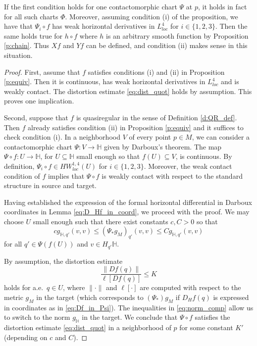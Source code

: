 \documentclass[10pt,letterpaper]{amsart}
\theoremstyle{definition}
\numberwithin{thm}{subsection}
\numberwithin{equation}{section}
\begin{document}
If the first condition holds for one contactomorphic chart $\Psi$
at $p$, it holds in fact for all such charts $\Phi$.
Moreover, assuming condition (i) of the proposition, we have that $\Psi_i \circ f$ has
weak horizontal derivatives in $L_{loc}^4$ for $i\in \{1,2,3\}$.
Then the same holds true for $h \circ f$ where $h$ is an arbitrary
smooth function by Proposition \ref{p:chain}.
Thus $Xf$ and $Yf$ can be defined, and
condition (ii) makes sense in this situation.

\begin{proof}
First, assume that $f$ satisfies conditions (i) and (ii) in Proposition \ref{p:equiv}. Then it is continuous,
has weak horizontal derivatives in $L_{loc}^{4}$ and is weakly contact. The distortion estimate
\eqref{eq:dist_quot} holds by assumption. This proves one implication.

Second, suppose that $f$ is quasiregular in the sense of
Definition \ref{d:QR_def}. Then $f$ already satisfies
condition (ii) in Proposition \ref{p:equiv} and it suffices to check condition (i). In a
neighborhood $V$ of every point $p\in M$, we can consider a
contactomorphic chart $\Psi: V \to {\mathbb H}$ given by
Darboux's theorem. The map $\Psi \circ f: U \to {\mathbb H}$, for
$U\subseteq {\mathbb H}$ small enough so that $f(U) \subseteq V$,
is continuous. By definition, $\Psi_i \circ f\in
HW_{loc}^{1,4}(U)$ for $i\in \{1,2,3\}$. Moreover, the weak
contact condition of $f$ implies that $\Psi\circ f$ is weakly contact with respect to the standard structure in source and target.

Having established the expression of the formal horizontal differential in Darboux coordinates in Lemma \ref{eq:D_Hf_in_coord}, we proceed with the proof.
We may choose $U$ small enough such that there exist constants $c,C>0$ so that
\begin{equation}\label{eq:norm_comp}
c g_{{\mathbb H},q'}(v,v) \leq (\Psi_{\ast} g_M)_{q'}(v,v)
\leq C g_{{\mathbb H},q'}(v,v)
\end{equation}
for all $q'\in \Psi(f(U))$ and $v \in H_{q'} {\mathbb H}$.

By assumption, the distortion estimate
\begin{displaymath}
\frac{\|Df(q)\|}{\ell[Df(q)]}\le K
\end{displaymath}
holds for a.e.\ $q\in U$, where $\|\cdot\|$ and $\ell[\cdot]$ are computed with respect to
the metric $g_M$ in the target (which corresponds to $(\Psi_{\ast})g_M$ if
$D_H f(q)$ is expressed in coordinates as in \eqref{eq:Df_in_Psi}).
The inequalities in \eqref{eq:norm_comp} allow us to switch to the norm $g_{\mathbb H}$ in the target.
We conclude that $\Psi \circ f$ satisfies the distortion estimate \eqref{eq:dist_quot} in a neighborhood of $p$ for {some}
constant $K'$  (depending on $c$ and $C$).
\end{proof}
\end{document}
